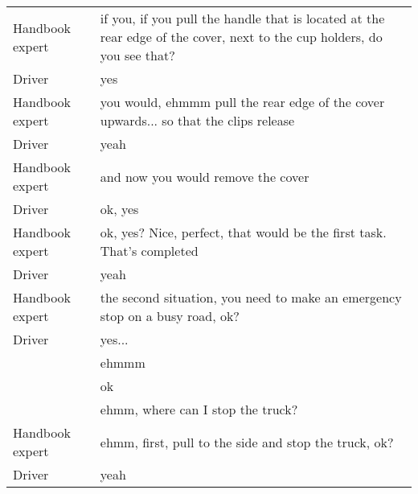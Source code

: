 \begin{table}[H]
\begin{tabular}{p{3cm}p{8cm}}
Handbook expert & if you, if you pull the handle that is located at the rear edge of the cover, next to the cup holders, do you see that? \\
Driver          & yes                                                                                                                     \\
Handbook expert & you would, ehmmm  pull the rear edge of the cover upwards... so that the clips release                                  \\
Driver          & yeah                                                                                                                    \\
Handbook expert & and now you would remove the cover                                                                                      \\
Driver          & ok, yes                                                                                                                 \\
Handbook expert & ok, yes? Nice, perfect, that would be the first task. That's completed                                                  \\
Driver          & yeah                                                                                                                    \\
Handbook expert & the second situation, you need to make an emergency stop on a busy road, ok?                                            \\
Driver          & yes...                                                                                                                  \\
                & ehmmm                                                                                                                   \\
                & ok                                                                                                                      \\
                & ehmm, where can I stop the truck?                                                                                       \\
Handbook expert & ehmm, first, pull to the side and stop the truck, ok?                                                                   \\
Driver          & yeah                                                                                                                    \\

\end{tabular}
\end{table}
